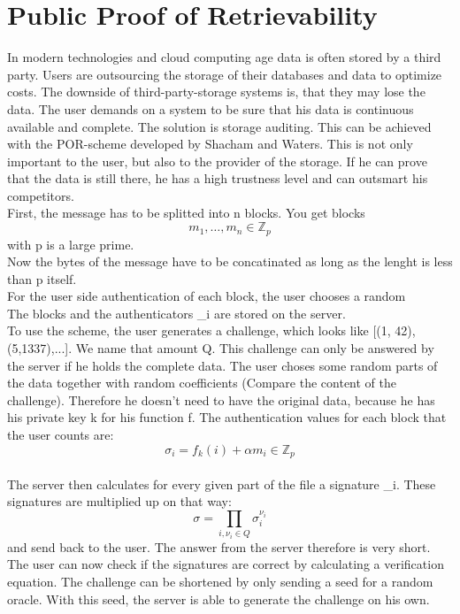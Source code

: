 \documentclass{amsart}
\begin{document}
\section{Public Proof of Retrievability}
In modern technologies and cloud computing age data is often stored by a third party. Users are outsourcing the storage of their databases and data to optimize costs. The downside of third-party-storage systems is, that they may lose the data. The user demands on a system to be sure that his data is continuous available and complete. The solution is storage auditing. This can be achieved with the POR-scheme developed by Shacham and Waters. This is not only important to the user, but also to the provider of the storage. If he can prove that the data is still there, he has a high trustness level and can outsmart his competitors.
\\
First, the message has to be splitted into n blocks. You get blocks 
\begin{equation}
m_{1}, \dots , m_{n} \in \mathbb{Z}_{p} 
\end{equation}
with p is a large prime.\\
Now the bytes of the message have to be concatinated as long as the lenght is less than p itself.\\
For the user side authentication of each block, the user chooses a random 
\begin{equation}
\end{equation}
The blocks and the authenticators \sigma_{i} are stored on the server. 
\\
To use the scheme, the user generates a challenge, which looks like [(1, 42), (5,1337),...]. We name that amount Q. This challenge can only be answered by the server if he holds the complete data. The user choses some random parts of the data together with random coefficients (Compare the content of the challenge). Therefore he doesn't need to have the original data, because he has his private key k for his function f. The authentication values for each block that the user counts are:
\begin{equation}
\sigma_{i} = f_{k}(i) + \alpha m_{i} \in \mathbb{Z}_{p}
\end{equation}
\\
The server then calculates for every given part of the file a signature \sigma_{i}. These signatures are multiplied up on that way:
\begin{equation}
\sigma = \prod_{i, \nu_{i} \in Q} \sigma_{i}^{\nu_{i}}
\end{equation}
and send back to the user. The answer from the server therefore is very short. The user can now check if the signatures are correct by calculating a verification equation. The challenge can be shortened by only sending a seed for a random oracle. With this seed, the server is able to generate the challenge on his own.
\end{document}
